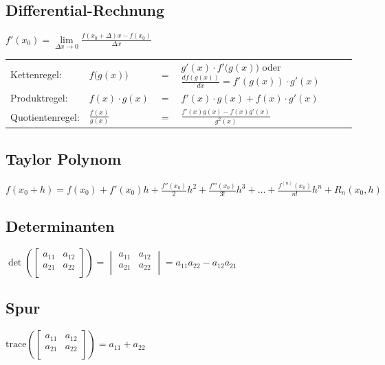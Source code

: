 \documentclass[a4paper, 10pt]{scrartcl}
\begin{document}
\subsection{Differential-Rechnung}
$f'(x_0)=\lim\limits_{\Delta x\rightarrow 0}
\frac{f(x_0+\Delta)x-f(x_0)}{\Delta x}$\\
\begin{tabular}{llll}
	Kettenregel:	& $f\big(g(x)\big)$ &$=$ & $g'(x)\cdot f'\big(g(x)\big)$
	oder $\frac{d f(g(x))}{dx} = f'(g(x)) \cdot g'(x)$\\[0.1cm] Produktregel:	&
	$f(x)\cdot g(x)$ &$=$ & $f'(x)\cdot g(x) + f(x)\cdot g'(x)$\\[0.1cm] Quotientenregel:& $\frac{f(x)}{g(x)}$ &$=$ & $\frac{f'(x)g(x)-f(x)g'(x)}{g^2(x)}$\\
\end{tabular}


\subsection{Taylor Polynom}
$f(x_0+h)=f(x_0) + f'(x_0)h + \frac{f''(x_0)}{2}h^2 + \frac{f'''(x_0)}{3!}h^3 + \ldots + \frac{f^{(n)}(x_0)}{n!}h^n + R_n(x_0, h)$

\subsection{Determinanten}
$\det\left(
\begin{bmatrix}
a_{11}&a_{12}\\
a_{21}&a_{22}\\
\end{bmatrix}\right)=
\begin{vmatrix}
a_{11}&a_{12}\\
a_{21}&a_{22}\\
\end{vmatrix}=a_{11}a_{22}-a_{12}a_{21}$

\subsection{Spur}
$\text{trace}\left(
\begin{bmatrix}
a_{11}&a_{12}\\
a_{21}&a_{22}\\
\end{bmatrix}\right)=
a_{11} + a_{22}$\\
\end{document}
